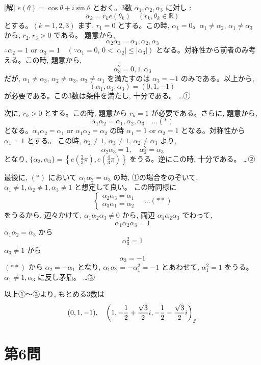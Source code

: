 \documentclass[../main.tex]{subfiles}
\begin{document}
[解] $e(\theta) = \cos\theta + i\sin\theta$ とおく。3数 $\alpha_1, \alpha_2, \alpha_3$ に対し :
\[ \alpha_k = r_k e(\theta_k) \quad (r_k, \theta_k \in \mathbb{R}) \]
とする。$(k=1, 2, 3)$ まず, $r_1=0$ とする。この時, $\alpha_1=0$。$\alpha_1 \ne \alpha_2, \, \alpha_1 \ne \alpha_3$ から, $r_2, r_3 > 0$ である。
題意から,
\[ \alpha_2 \alpha_3 = \alpha_1, \alpha_2, \alpha_3 \]
$\therefore \alpha_2 = 1 \text{ or } \alpha_3 = 1 \quad (\because \alpha_1=0, \, 0 < |\alpha_2| \le |\alpha_3|)$
となる。対称性から前者のみ考える。この時, 題意から,
\[ \alpha_3^2 = 0, 1, \alpha_3 \]
だが, $\alpha_1 \ne \alpha_3, \, \alpha_2 \ne \alpha_3, \, \alpha_3 \ne \alpha_1$ を満たすのは $\alpha_3 = -1$ のみである。以上から,
\[ (\alpha_1, \alpha_2, \alpha_3) = (0, 1, -1) \]
が必要である。この3数は条件を満たし, 十分である。 \dots ①

次に, $r_k > 0$ とする。この時, 題意から $r_k = 1$ が必要である。さらに, 題意から,
\[ \alpha_1 \alpha_2 = \alpha_1, \alpha_2, \alpha_3 \quad \dots (*) \]
となる。$\alpha_1 \alpha_2 = \alpha_1$ or $\alpha_1 \alpha_2 = \alpha_2$ の時 $\alpha_1 = 1$ or $\alpha_2 = 1$ となる。対称性から $\alpha_1 = 1$ とする。
この時, $\alpha_2 \ne 1, \, \alpha_3 \ne 1, \, \alpha_2 \ne \alpha_3$ より,
\[ \alpha_2 \alpha_3 = 1, \quad \alpha_2^2 = \alpha_3 \]
となり, $\{ \alpha_2, \alpha_3 \} = \left\{ e\left(\frac{2}{3}\pi\right), e\left(\frac{4}{3}\pi\right) \right\}$ をうる。逆にこの時, 十分である。 \dots ②

最後に, $(*)$ において $\alpha_1 \alpha_2 = \alpha_3$ の時, ①の場合をのぞいて, $\alpha_1 \ne 1, \alpha_2 \ne 1, \alpha_3 \ne 1$ と想定して良い。
この時同様に
\[
  \begin{cases}
    \alpha_2 \alpha_3 = \alpha_1 \\
    \alpha_3 \alpha_1 = \alpha_2
  \end{cases}
  \quad \dots (**)
\]
をうるから, 辺々かけて, $\alpha_1 \alpha_2 \alpha_3 \ne 0$ から, 両辺 $\alpha_1 \alpha_2 \alpha_3$ でわって,
\[ \alpha_1 \alpha_2 \alpha_3 = 1 \]
$\alpha_1 \alpha_2 = \alpha_3$ から
\[ \alpha_3^2 = 1 \]
$\alpha_3 \ne 1$ から
\[ \alpha_3 = -1 \]
$(**)$ から $\alpha_2 = -\alpha_1$ となり, $\alpha_1 \alpha_2 = -\alpha_1^2 = -1$ とあわせて, $\alpha_1^2 = 1$ をうる。$\alpha_1 \ne 1, \alpha_3$ に反し矛盾。 \dots ③

以上①〜③より, もとめる3数は
\[ (0, 1, -1), \quad \left(1, -\frac{1}{2}+\frac{\sqrt{3}}{2}i, -\frac{1}{2}-\frac{\sqrt{3}}{2}i\right) _{\mathbin{/\mkern-6mu/}} \]

\section*{第6問}
\end{document}
